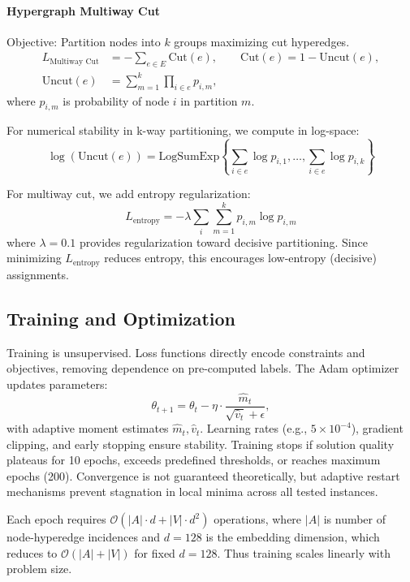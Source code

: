\documentclass[conference]{IEEEtran}
\begin{document}
\paragraph{Hypergraph Multiway Cut}
Objective: Partition nodes into \(k\) groups maximizing cut hyperedges.
\begin{align}
L_{\text{Multiway Cut}} &= - \sum_{e \in E} \mathrm{Cut}(e), \qquad \mathrm{Cut}(e) = 1 - \mathrm{Uncut}(e), \\
\mathrm{Uncut}(e) &= \sum_{m=1}^{k} \prod_{i \in e} p_{i,m},
\end{align}
where \(p_{i,m}\) is probability of node \(i\) in partition \(m\).

For numerical stability in k-way partitioning, we compute in log-space:
\begin{equation}
\log(\mathrm{Uncut}(e)) = \text{LogSumExp}\left\{\sum_{i \in e} \log p_{i,1}, \ldots, \sum_{i \in e} \log p_{i,k}\right\}
\end{equation}

For multiway cut, we add entropy regularization:
\begin{equation}
L_{\text{entropy}} = -\lambda \sum_i \sum_{m=1}^k p_{i,m} \log p_{i,m}
\end{equation}
where \(\lambda = 0.1\) provides regularization toward decisive partitioning. Since minimizing \(L_{\text{entropy}}\) reduces entropy, this encourages low-entropy (decisive) assignments.

\subsection{Training and Optimization}
Training is unsupervised. Loss functions directly encode constraints and objectives, removing dependence on pre-computed labels. The Adam optimizer updates parameters:
\begin{equation}
\theta_{t+1} = \theta_t - \eta \cdot \frac{\hat{m}_t}{\sqrt{\hat{v}_t} + \epsilon},
\end{equation}
with adaptive moment estimates \(\hat{m}_t, \hat{v}_t\). Learning rates (e.g., \(5 \times 10^{-4}\)), gradient clipping, and early stopping ensure stability. Training stops if solution quality plateaus for 10 epochs, exceeds predefined thresholds, or reaches maximum epochs (200). Convergence is not guaranteed theoretically, but adaptive restart mechanisms prevent stagnation in local minima across all tested instances.

Each epoch requires \(\mathcal{O}(|A| \cdot d + |V| \cdot d^2)\) operations, where \(|A|\) is number of node-hyperedge incidences and \(d = 128\) is the embedding dimension, which reduces to \(\mathcal{O}(|A| + |V|)\) for fixed \(d=128\). Thus training scales linearly with problem size.
\end{document}
